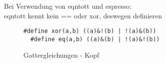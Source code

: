 
Bei Verwendung von eqntott und espresso:\\
eqntott kennt kein == oder xor, deswegen definieren\\
\begin{figure}[!h]
  \centering
  \begin{minipage}[c]{14.5cm}
    \begin{lstlisting}[]
  #define xor(a,b) ((a)&!(b) | !(a)&(b))
  #define eq(a,b) ((a)&(b) | !(a)&!(b))
    \end{lstlisting}
  \end{minipage}
  \caption{Gattergleichungen - Kopf}
  \label{fig:gatter_equations_head}
\end{figure}








